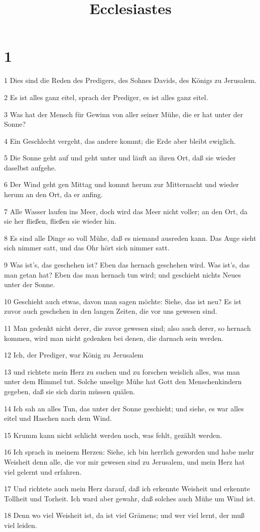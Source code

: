 

\title{Ecclesiastes}


\chapter{1}

\par 1 Dies sind die Reden des Predigers, des Sohnes Davids, des Königs zu Jerusalem.
\par 2 Es ist alles ganz eitel, sprach der Prediger, es ist alles ganz eitel.
\par 3 Was hat der Mensch für Gewinn von aller seiner Mühe, die er hat unter der Sonne?
\par 4 Ein Geschlecht vergeht, das andere kommt; die Erde aber bleibt ewiglich.
\par 5 Die Sonne geht auf und geht unter und läuft an ihren Ort, daß sie wieder daselbst aufgehe.
\par 6 Der Wind geht gen Mittag und kommt herum zur Mitternacht und wieder herum an den Ort, da er anfing.
\par 7 Alle Wasser laufen ins Meer, doch wird das Meer nicht voller; an den Ort, da sie her fließen, fließen sie wieder hin.
\par 8 Es sind alle Dinge so voll Mühe, daß es niemand ausreden kann. Das Auge sieht sich nimmer satt, und das Ohr hört sich nimmer satt.
\par 9 Was ist's, das geschehen ist? Eben das hernach geschehen wird. Was ist's, das man getan hat? Eben das man hernach tun wird; und geschieht nichts Neues unter der Sonne.
\par 10 Geschieht auch etwas, davon man sagen möchte: Siehe, das ist neu? Es ist zuvor auch geschehen in den langen Zeiten, die vor uns gewesen sind.
\par 11 Man gedenkt nicht derer, die zuvor gewesen sind; also auch derer, so hernach kommen, wird man nicht gedenken bei denen, die darnach sein werden.
\par 12 Ich, der Prediger, war König zu Jerusalem
\par 13 und richtete mein Herz zu suchen und zu forschen weislich alles, was man unter dem Himmel tut. Solche unselige Mühe hat Gott den Menschenkindern gegeben, daß sie sich darin müssen quälen.
\par 14 Ich sah an alles Tun, das unter der Sonne geschieht; und siehe, es war alles eitel und Haschen nach dem Wind.
\par 15 Krumm kann nicht schlicht werden noch, was fehlt, gezählt werden.
\par 16 Ich sprach in meinem Herzen: Siehe, ich bin herrlich geworden und habe mehr Weisheit denn alle, die vor mir gewesen sind zu Jerusalem, und mein Herz hat viel gelernt und erfahren.
\par 17 Und richtete auch mein Herz darauf, daß ich erkennte Weisheit und erkennte Tollheit und Torheit. Ich ward aber gewahr, daß solches auch Mühe um Wind ist.
\par 18 Denn wo viel Weisheit ist, da ist viel Grämens; und wer viel lernt, der muß viel leiden.

